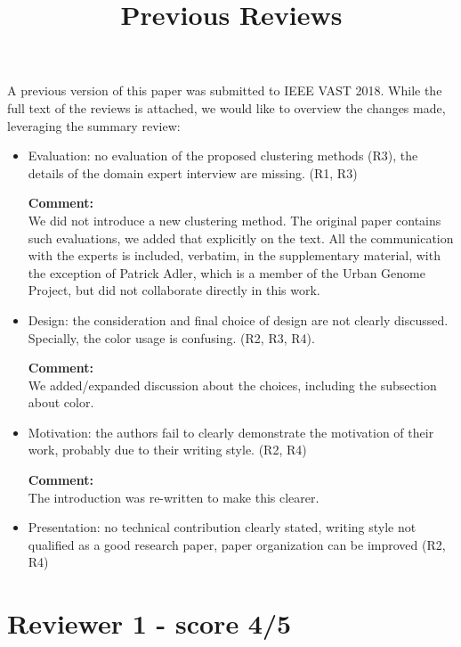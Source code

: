 \documentclass{article}
\title{Previous Reviews}
\newcommand{\reply}[1]{\begin{tcolorbox}\noindent\textbf{Comment:}\\#1\hfill\end{tcolorbox}}
\begin{document}
\maketitle
A previous version of this paper was submitted to IEEE VAST 2018. While the full
text of the reviews is attached, we would like to overview the changes made,
leveraging the summary review:


\begin{itemize}
    \item{Evaluation: no evaluation of the proposed clustering methods (R3), the details
    of the domain expert interview are missing. (R1, R3)
    
    \reply{We did not introduce a new clustering method. The original paper
    contains such evaluations, we added that explicitly on the text. All the
    communication with the experts is included, verbatim, in the supplementary
    material, with the exception of Patrick Adler, which is a member of the
    Urban Genome Project, but did not collaborate directly in this work.}}

    \item{Design: the consideration and final choice of design are not clearly discussed.
    Specially, the color usage is confusing. (R2, R3, R4).
    
    \reply{We added/expanded discussion about the choices, including the
     subsection about color.}}

    \item{Motivation: the authors fail to clearly demonstrate the motivation of their
    work, probably due to their writing style. (R2, R4)}
    \reply{The introduction was re-written to make this clearer.}

    \item{Presentation: no technical contribution clearly stated, writing style not
    qualified as a good research paper, paper organization can be improved (R2, R4)}
\end{itemize}

\section{Reviewer 1 - score 4/5}
\end{document}
